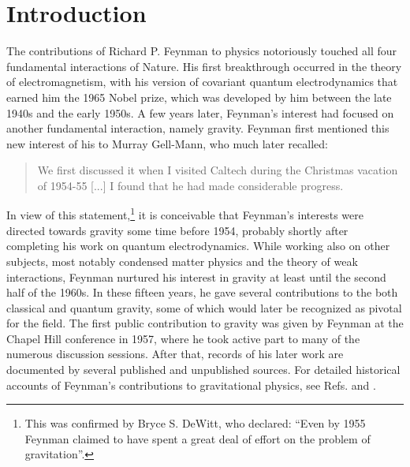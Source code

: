 \documentclass{ws-procs961x669}            %
\begin{document}
\section{Introduction}\label{aba:sec1}
The contributions of Richard P. Feynman to physics notoriously
touched all four fundamental interactions of Nature. His first
breakthrough occurred in the theory of electromagnetism, with his
version of covariant quantum electrodynamics that earned him the
1965 Nobel prize\cite{Feynman:1965jda}, which was developed by him
between the late 1940s and the early 1950s. A few years later,
Feynman's interest had focused on another fundamental interaction,
namely gravity. Feynman first mentioned this new interest of his
to Murray Gell-Mann, who much later recalled:
\begin{quote}
We first discussed it when I visited Caltech during the Christmas
vacation of 1954-55 [...] I found that he had made considerable
progress\cite{Gell-Mann}.
\end{quote}
In view of this statement,\footnote{This was confirmed by Bryce S.
DeWitt, who declared: ``Even by 1955 Feynman claimed to have spent
a great deal of effort on the problem of
gravitation''\cite{Letter}.} it is conceivable that Feynman's
interests were directed towards gravity some time before 1954,
probably shortly after completing his work on quantum
electrodynamics. While working also on other subjects, most
notably condensed matter physics and the theory of weak
interactions\cite{Mehra:1994dz}, Feynman nurtured his interest in
gravity at least until the second half of the 1960s. In these
fifteen years, he gave several contributions to the both classical
and quantum gravity, some of which would later be recognized as
pivotal for the field. The first public contribution to gravity
was given by Feynman at the Chapel Hill conference in
1957\cite{ChapelHill}, where he took active part to many of the
numerous discussion sessions. After that, records of his later
work are documented by several published and unpublished sources.
For detailed historical accounts of Feynman's contributions to
gravitational physics, see Refs.  and
.
\end{document}
